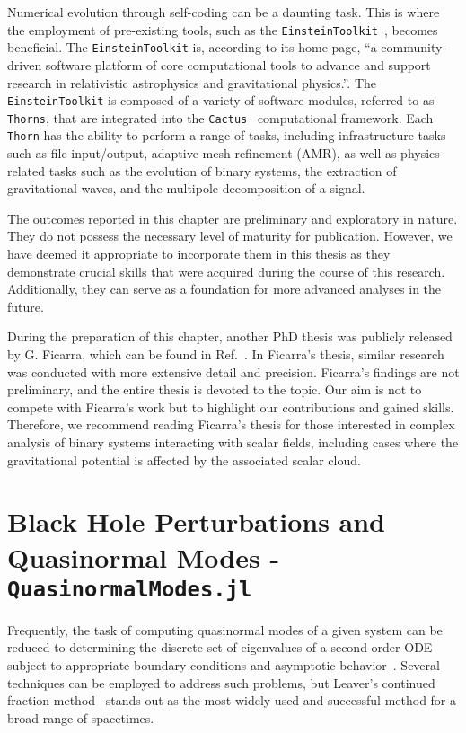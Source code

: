 Numerical evolution through self-coding can be a daunting task. This is where the employment of pre-existing tools, such as the \texttt{EinsteinToolkit}~\cite{EinsteinToolkit:2022_11}, becomes beneficial. The \texttt{EinsteinToolkit} is, according to its home page, ``a community-driven software platform of core computational tools to advance and support research in relativistic astrophysics and gravitational physics.''. The \texttt{EinsteinToolkit} is composed of a variety of software modules, referred to as \texttt{Thorns}, that are integrated into the \texttt{Cactus}~\cite{Goodale:2002a} computational framework. Each \texttt{Thorn} has the ability to perform a range of tasks, including infrastructure tasks such as file input/output, adaptive mesh refinement (\ac{AMR}), as well as physics-related tasks such as the evolution of binary systems, the extraction of gravitational waves, and the multipole decomposition of a signal.

The outcomes reported in this chapter are preliminary and exploratory in nature. They do not possess the necessary level of maturity for publication. However, we have deemed it appropriate to incorporate them in this thesis as they demonstrate crucial skills that were acquired during the course of this research. Additionally, they can serve as a foundation for more advanced analyses in the future.

During the preparation of this chapter, another PhD thesis was publicly released by G. Ficarra, which can be found in Ref.~\cite{Ficarra2023}. In Ficarra's thesis, similar research was conducted with more extensive detail and precision. Ficarra's findings are not preliminary, and the entire thesis is devoted to the topic. Our aim is not to compete with Ficarra's work but to highlight our contributions and gained skills. Therefore, we recommend reading Ficarra's thesis for those interested in complex analysis of binary systems interacting with scalar fields, including cases where the gravitational potential is affected by the associated scalar cloud.

\section{Black Hole Perturbations and Quasinormal Modes - \texttt{QuasinormalModes.jl}}

Frequently, the task of computing quasinormal modes of a given system can be reduced to determining the discrete set of eigenvalues of a second-order \ac{ODE} subject to appropriate boundary conditions and asymptotic behavior~\cite{review3}. Several techniques can be employed to address such problems, but Leaver's continued fraction method~\cite{Leaver1985} stands out as the most widely used and successful method for a broad range of spacetimes.

